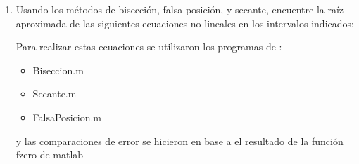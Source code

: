\documentclass{udpreport}
\begin{document}
\begin{enumerate}
\item Usando los métodos de bisección, falsa posición, y secante, encuentre la raíz aproximada 
de las siguientes ecuaciones no lineales en los intervalos indicados:

    \begin{enumerate}
        
    Para realizar estas ecuaciones se utilizaron los programas de :
    \begin{itemize}
        \item Biseccion.m
        \item Secante.m
        \item FalsaPosicion.m
    \end{itemize}
    y las comparaciones de error se hicieron en base a el resultado de la función fzero de matlab
    

\end{enumerate}
\end{enumerate}
\end{document}
